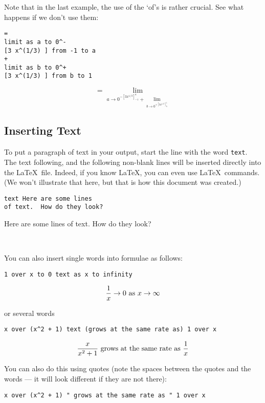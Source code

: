 \documentclass[12pt]{article}
\begin{document}
\noindent Note that in the last example, the use of the `of's is rather crucial.  See
what happens if we don't use them:

\begin{verbatim}
= 
limit as a to 0^-
[3 x^(1/3) ] from -1 to a
+ 
limit as b to 0^+
[3 x^(1/3) ] from b to 1
\end{verbatim}

\[
 = \lim _ {a \to {0} ^ { - \left[ 3 {x} ^ {1 / 3} \right] _ { - 1} ^ {a}} + \lim _ {b \to {0} ^ { + \left[ 3 {x} ^ {1 / 3} \right] _ {b} ^ {1}}}}
\]

\noindent \subsection{Inserting Text}

\noindent To put a paragraph of text in your output, start the line with the
word {\tt text}.  The text following, and the following non-blank
lines will be inserted directly into the La\TeX\ file.  Indeed, if you
know La\TeX, you can even use La\TeX\ commands.  (We won't illustrate
that here, but that is how this document was created.)

\noindent \begin{verbatim}
text Here are some lines
of text.  How do they look?
\end{verbatim}

\noindent Here are some lines
of text.  How do they look?

\noindent \

\noindent You can also insert single words into formulae as follows:

\begin{verbatim}
1 over x to 0 text as x to infinity
\end{verbatim}

\[
\frac {1} {x} \to 0 \hbox{ as } x \to \infty
\]

\noindent or several words

\begin{verbatim}
x over (x^2 + 1) text (grows at the same rate as) 1 over x
\end{verbatim}

\[
\frac {x} {{x} ^ {2} + 1} \hbox{   grows at the same rate as  } \frac {1} {x}
\]

\noindent You can also do this using quotes (note the spaces between the quotes and
the words --- it will look different if they are not there):

\begin{verbatim}
x over (x^2 + 1) " grows at the same rate as " 1 over x
\end{verbatim}
\end{document}
